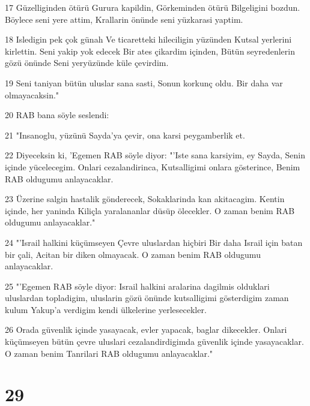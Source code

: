 \par 17 Güzelliginden ötürü Gurura kapildin, Görkeminden ötürü Bilgeligini bozdun. Böylece seni yere attim, Krallarin önünde seni yüzkarasi yaptim.
\par 18 Isledigin pek çok günah Ve ticaretteki hileciligin yüzünden Kutsal yerlerini kirlettin. Seni yakip yok edecek Bir ates çikardim içinden, Bütün seyredenlerin gözü önünde Seni yeryüzünde küle çevirdim.
\par 19 Seni taniyan bütün uluslar sana sasti, Sonun korkunç oldu. Bir daha var olmayacaksin."
\par 20 RAB bana söyle seslendi:
\par 21 "Insanoglu, yüzünü Sayda'ya çevir, ona karsi peygamberlik et.
\par 22 Diyeceksin ki, 'Egemen RAB söyle diyor: "'Iste sana karsiyim, ey Sayda, Senin içinde yücelecegim. Onlari cezalandirinca, Kutsalligimi onlara gösterince, Benim RAB oldugumu anlayacaklar.
\par 23 Üzerine salgin hastalik gönderecek, Sokaklarinda kan akitacagim. Kentin içinde, her yaninda Kiliçla yaralananlar düsüp ölecekler. O zaman benim RAB oldugumu anlayacaklar."
\par 24 "'Israil halkini küçümseyen Çevre uluslardan hiçbiri Bir daha Israil için batan bir çali, Acitan bir diken olmayacak. O zaman benim RAB oldugumu anlayacaklar.
\par 25 "'Egemen RAB söyle diyor: Israil halkini aralarina dagilmis olduklari uluslardan topladigim, uluslarin gözü önünde kutsalligimi gösterdigim zaman kulum Yakup'a verdigim kendi ülkelerine yerlesecekler.
\par 26 Orada güvenlik içinde yasayacak, evler yapacak, baglar dikecekler. Onlari küçümseyen bütün çevre uluslari cezalandirdigimda güvenlik içinde yasayacaklar. O zaman benim Tanrilari RAB oldugumu anlayacaklar."

\chapter{29}

